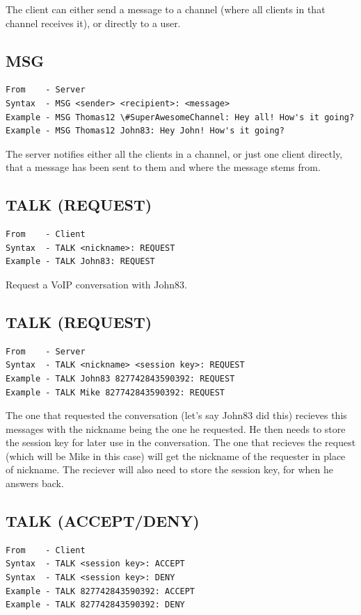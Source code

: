 \documentclass[12pt]{rapport}
\begin{document}
\noindent The client can either send a message to a channel (where all
clients in that channel receives it), or directly to a user.

\subsection*{MSG}
\begin{verbatim}
From    - Server
Syntax  - MSG <sender> <recipient>: <message>
Example - MSG Thomas12 \#SuperAwesomeChannel: Hey all! How's it going?
Example - MSG Thomas12 John83: Hey John! How's it going?
\end{verbatim}

\noindent The server notifies either all the clients in a channel, or
just one client directly, that a message has been sent to them and
where the message stems from.

\subsection*{TALK (REQUEST)}
\begin{verbatim}
From    - Client
Syntax  - TALK <nickname>: REQUEST
Example - TALK John83: REQUEST
\end{verbatim}

\noindent Request a VoIP conversation with John83.

\subsection*{TALK (REQUEST)}
\begin{verbatim}
From    - Server
Syntax  - TALK <nickname> <session key>: REQUEST
Example - TALK John83 827742843590392: REQUEST
Example - TALK Mike 827742843590392: REQUEST
\end{verbatim}

\noindent The one that requested the conversation (let's say John83
did this) recieves this messages with the nickname being the one he
requested. He then needs to store the session key for later use in the
conversation.
\noindent The one that recieves the request (which will be Mike in
this case) will get the nickname of the requester in place of
nickname. The reciever will also need to store the session key, for
when he answers back.

\subsection*{TALK (ACCEPT/DENY)}
\begin{verbatim}
From    - Client
Syntax  - TALK <session key>: ACCEPT
Syntax  - TALK <session key>: DENY
Example - TALK 827742843590392: ACCEPT
Example - TALK 827742843590392: DENY
\end{verbatim}
\end{document}
